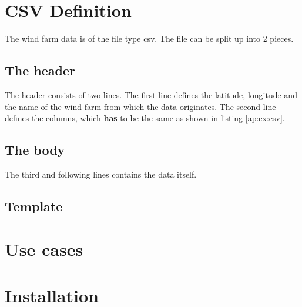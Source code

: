 \chapter{CSV Definition}
\label{ap:csv}
The wind farm data is of the file type csv. The file can be split up into 2 pieces.
\section{The header}
The header consists of two lines. The first line defines the latitude, longitude and the name of the wind farm from which the data originates.
The second line defines the columns, which \textbf{has} to be the same as shown in listing \ref{ap:ex:csv}.

\section{The body}
The third and following lines contains the data itself.

\section{Template}


\chapter{Use cases}
\label{ap:usecase}


\chapter{Installation}
\label{ap:installation}
